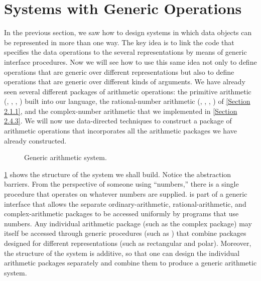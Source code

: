 \section{Systems with Generic Operations}
\label{Section 2.5}

In the previous section, we saw how to design systems in which data objects can be represented in more than one way.
The key idea is to link the code that specifies the data operations to the several representations by means of generic interface procedures.
Now we will see how to use this same idea not only to define operations that are generic over different representations but also to define operations that are generic over different kinds of arguments.
We have already seen several different packages of arithmetic operations:
the primitive arithmetic (\code{+}, \code{-}, \code{*}, \code{/}) built into our language, the rational-number arithmetic (, , , ) of \cref{Section 2.1.1}, and the complex-number arithmetic that we implemented in \cref{Section 2.4.3}.
We will now use data-directed techniques to construct a package of arithmetic operations that incorporates all the arithmetic packages we have already constructed.

\begin{figure}[tb]
	\centering
	
	\caption{Generic arithmetic system.}
	\label{Figure 2.23}
\end{figure}

\cref{Figure 2.23} shows the structure of the system we shall build.
Notice the abstraction barriers.
From the perspective of someone using “numbers,” there is a single procedure  that operates on whatever numbers are supplied.
 is part of a generic interface that allows the separate ordinary-arithmetic, rational-arithmetic, and complex-arithmetic packages to be accessed uniformly by programs that use numbers.
Any individual arithmetic package (such as the complex package) may itself be accessed through generic procedures (such as ) that combine packages designed for different representations (such as rectangular and polar).
Moreover, the structure of the system is additive, so that one can design the individual arithmetic packages separately and combine them to produce a generic arithmetic system.




